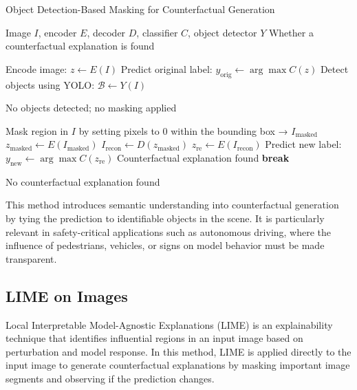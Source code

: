 \vspace{1em}
\begin{algorithm}[H]
\caption{Object Detection-Based Masking for Counterfactual Generation}
\label{alg:object_detection_masking}
\begin{algorithmic}[1]
\REQUIRE Image $I$, encoder $E$, decoder $D$, classifier $C$, object detector $Y$
\ENSURE Whether a counterfactual explanation is found

\STATE Encode image: $z \leftarrow E(I)$
\STATE Predict original label: $y_{\text{orig}} \leftarrow \arg\max C(z)$
\STATE Detect objects using YOLO: $\mathcal{B} \leftarrow Y(I)$

    \RETURN No objects detected; no masking applied
\ENDIF

    \STATE Mask region in $I$ by setting pixels to 0 within the bounding box → $I_{\text{masked}}$
    \STATE $z_{\text{masked}} \leftarrow E(I_{\text{masked}})$
    \STATE $I_{\text{recon}} \leftarrow D(z_{\text{masked}})$
    \STATE $z_{\text{re}} \leftarrow E(I_{\text{recon}})$
    \STATE Predict new label: $y_{\text{new}} \leftarrow \arg\max C(z_{\text{re}})$
        \RETURN Counterfactual explanation found
    \ENDIF
    \STATE \textbf{break} 
\ENDFOR

\RETURN No counterfactual explanation found
\end{algorithmic}
\end{algorithm}
\vspace{1em}

This method introduces semantic understanding into counterfactual generation by tying the prediction to identifiable objects in the scene. It is particularly relevant in safety-critical applications such as autonomous driving, where the influence of pedestrians, vehicles, or signs on model behavior must be made transparent.



\subsection{LIME on Images} \label{sec:lime_on_images}
Local Interpretable Model-Agnostic Explanations (LIME) is an explainability technique that identifies influential regions in an input image based on perturbation and model response. In this method, LIME is applied directly to the input image to generate counterfactual explanations by masking important image segments and observing if the prediction changes.

